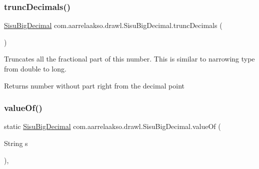 \mbox{\label{classcom_1_1aarrelaakso_1_1drawl_1_1_sisu_big_decimal_ab81d0189bbfd5f1b69de6781ac383ac3}} 
\subsubsection{\texorpdfstring{trunc\+Decimals()}{truncDecimals()}}
{\footnotesize\ttfamily \hyperlink{classcom_1_1aarrelaakso_1_1drawl_1_1_sisu_big_decimal}{Sisu\+Big\+Decimal} com.\+aarrelaakso.\+drawl.\+Sisu\+Big\+Decimal.\+trunc\+Decimals (\begin{DoxyParamCaption}{ }\end{DoxyParamCaption})\hspace{0.3cm}{\ttfamily [protected]}}

Truncates all the fractional part of this number. This is similar to narrowing type from double to long.

\begin{DoxyReturn}{Returns}
number without part right from the decimal point 
\end{DoxyReturn}
\mbox{\label{classcom_1_1aarrelaakso_1_1drawl_1_1_sisu_big_decimal_a076ac8cd04ac04e39f7f3fcc7ce9a4a1}} 
\subsubsection{\texorpdfstring{value\+Of()}{valueOf()}\hspace{0.1cm}{\footnotesize\ttfamily [1/4]}}
{\footnotesize\ttfamily static \hyperlink{classcom_1_1aarrelaakso_1_1drawl_1_1_sisu_big_decimal}{Sisu\+Big\+Decimal} com.\+aarrelaakso.\+drawl.\+Sisu\+Big\+Decimal.\+value\+Of (\begin{DoxyParamCaption}\item[{String}]{s }\end{DoxyParamCaption})\hspace{0.3cm}{\ttfamily [static]}, {\ttfamily [protected]}}

